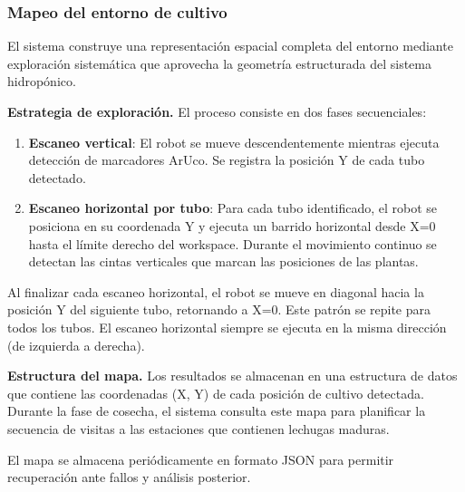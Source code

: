\subsubsection{Mapeo del entorno de cultivo}

El sistema construye una representación espacial completa del entorno mediante exploración sistemática que aprovecha la geometría estructurada del sistema hidropónico.

\textbf{Estrategia de exploración.} El proceso consiste en dos fases secuenciales:

\begin{enumerate}
    \item \textbf{Escaneo vertical}: El robot se mueve descendentemente mientras ejecuta detección de marcadores ArUco. Se registra la posición Y de cada tubo detectado.

    \item \textbf{Escaneo horizontal por tubo}: Para cada tubo identificado, el robot se posiciona en su coordenada Y y ejecuta un barrido horizontal desde X=0 hasta el límite derecho del workspace. Durante el movimiento continuo se detectan las cintas verticales que marcan las posiciones de las plantas.
\end{enumerate}

Al finalizar cada escaneo horizontal, el robot se mueve en diagonal hacia la posición Y del siguiente tubo, retornando a X=0. Este patrón se repite para todos los tubos. El escaneo horizontal siempre se ejecuta en la misma dirección (de izquierda a derecha).

\textbf{Estructura del mapa.} Los resultados se almacenan en una estructura de datos que contiene las coordenadas (X, Y) de cada posición de cultivo detectada. Durante la fase de cosecha, el sistema consulta este mapa para planificar la secuencia de visitas a las estaciones que contienen lechugas maduras.

El mapa se almacena periódicamente en formato JSON para permitir recuperación ante fallos y análisis posterior.
